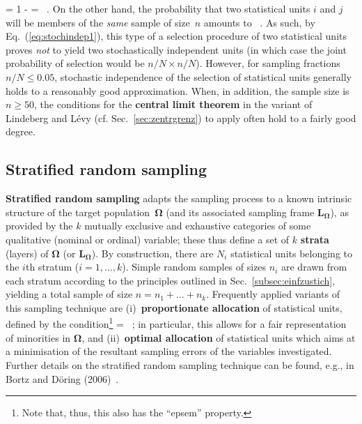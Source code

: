 = 1 -  =  \ .
\ee
%
On the other hand, the probability that two statistical units $i$ 
and $j$ will be members of the \textit{same} sample of size~$n$
amounts to
%
\be
{} \times {} \ .
\ee
%
As such, by Eq.~(\ref{eq:stochindep1}), this type of a selection 
procedure of two statistical units proves \textit{not} to yield two 
stochastically independent units (in which case the joint 
probability of selection would be $n/N \times n/N$). However, for 
sampling fractions $n/N \leq 0.05$, stochastic independence of the 
selection of statistical units generally holds to a reasonably 
good approximation. When, in addition, the sample size is $n
\geq 50$, the conditions for the \textbf{central limit theorem} in
the variant of Lindeberg and L\'{e}vy (cf.
Sec.~\ref{sec:zentrgrenz}) to apply often hold to a fairly good
degree.

\subsection[Stratified random sampling]{Stratified random sampling}
\textbf{Stratified random sampling} adapts the sampling process to
a known intrinsic structure of the target 
population~$\boldsymbol{\Omega}$ (and its associated sampling 
frame $\boldsymbol{L_{\Omega}}$), as provided by the $k$ mutually 
exclusive and exhaustive categories of some qualitative (nominal 
or ordinal) variable; these thus define a set of $k$
\textbf{strata} (layers) of $\boldsymbol{\Omega}$ (or
$\boldsymbol{L_{\Omega}}$). By construction, there are $N_{i}$
statistical units belonging to the $i$th stratum ($i=1, \ldots,
k$). Simple random samples of sizes $n_{i}$ are drawn from each
stratum according to the principles outlined in
Sec.~\ref{subsec:einfzustich}, yielding a total sample of size
$n=n_{1}+\ldots+n_{k}$. Frequently applied variants of this
sampling technique are (i)~\textbf{proportionate allocation} of
statistical units, defined by the condition\footnote{Note that,
thus, this also has the ``epsem'' property.}
%
\be
{} \stackrel{!}{=} 
\qquad\Rightarrow\qquad
{} =  \ ;
\ee
%
in particular, this allows for a fair representation of minorities 
in $\boldsymbol{\Omega}$, and (ii)~\textbf{optimal allocation} of 
statistical units which aims at a minimisation of the resultant 
sampling errors of the variables investigated. Further details on 
the stratified random sampling technique can be found, e.g., in 
Bortz and D\"{o}ring (2006)~.

